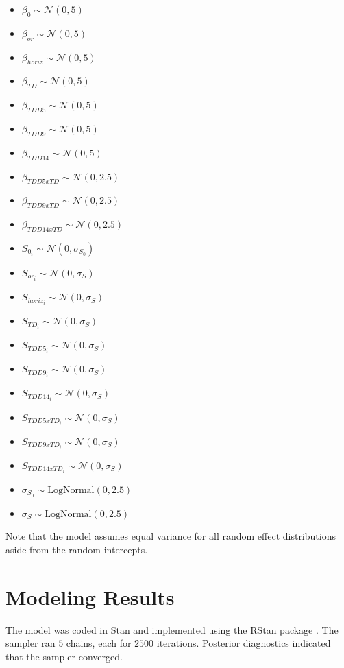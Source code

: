 \begin{itemize}
    \item $\beta_{0} \sim \mathcal{N}(0,5)$
    \item $\beta_{or} \sim \mathcal{N}(0,5)$
    \item $\beta_{horiz} \sim \mathcal{N}(0,5)$
    \item $\beta_{TD} \sim \mathcal{N}(0,5)$
    \item $\beta_{TDD5} \sim \mathcal{N}(0,5)$
    \item $\beta_{TDD9} \sim \mathcal{N}(0,5)$
    \item $\beta_{TDD14} \sim \mathcal{N}(0,5)$
    \item $\beta_{TDD5xTD} \sim \mathcal{N}(0,2.5)$
    \item $\beta_{TDD9xTD} \sim \mathcal{N}(0,2.5)$
    \item $\beta_{TDD14xTD} \sim \mathcal{N}(0,2.5)$
    \item $S_{0_{i}} \sim \mathcal{N}(0, \sigma_{S_0})$
    \item $S_{or_{i}} \sim \mathcal{N}(0, \sigma_{S})$
    \item $S_{horiz_{i}} \sim \mathcal{N}(0, \sigma_{S})$
    \item $S_{TD_{i}} \sim \mathcal{N}(0, \sigma_{S})$
    \item $S_{TDD5_{i}} \sim \mathcal{N}(0, \sigma_{S})$
    \item $S_{TDD9_{i}} \sim \mathcal{N}(0, \sigma_{S})$
    \item $S_{TDD14_{i}} \sim \mathcal{N}(0, \sigma_{S})$
    \item $S_{TDD5xTD_{i}} \sim \mathcal{N}(0, \sigma_{S})$
    \item $S_{TDD9xTD_{i}} \sim \mathcal{N}(0, \sigma_{S})$
    \item $S_{TDD14xTD_{i}} \sim \mathcal{N}(0, \sigma_{S})$
    \item $\sigma_{S_{0}} \sim \text{LogNormal}(0,2.5)$
    \item $\sigma_{S} \sim \text{LogNormal}(0,2.5)$
\end{itemize}

Note that the model assumes equal variance for all random effect distributions aside from the random intercepts.

\section{Modeling Results}
The model was coded in Stan \parencite{carpenter2017stan} and implemented using the RStan package \parencite{rstan}. The sampler ran $5$ chains, each for $2500$ iterations. Posterior diagnostics indicated that the sampler converged.

